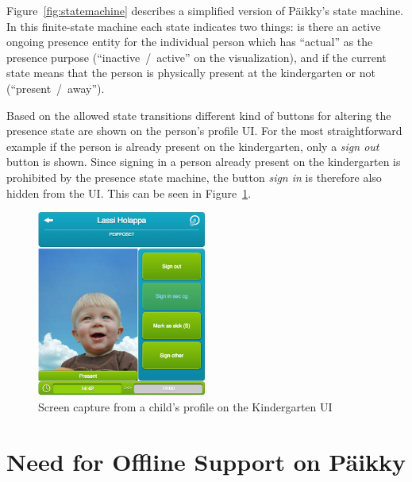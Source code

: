 Figure~\ref{fig:statemachine} describes a simplified version of Päikky's state machine. In this finite-state machine each state indicates two things: is there an active ongoing presence entity for the individual person which has ``actual'' as the presence purpose (``inactive~/~active'' on the visualization), and if the current state means that the person is physically present at the kindergarten or not (``present~/~away'').

Based on the allowed state transitions different kind of buttons for altering the presence state are shown on the person's profile UI. For the most straightforward example if the person is already present on the kindergarten, only a \textit{sign out} button is shown. Since signing in a person already present on the kindergarten is prohibited by the presence state machine, the button \textit{sign in} is therefore also hidden from the UI. This can be seen in Figure~\ref{fig:child-profile}. 


\begin{figure}[t]
\begin{center}
\includegraphics[width=0.5\textwidth]{assets/child-profile.png}
\end{center}
\caption{Screen capture from a child's profile on the Kindergarten UI}
\label{fig:child-profile}
\end{figure}







\section{Need for Offline Support on Päikky}
\label{sec:need-for-offline-support}


